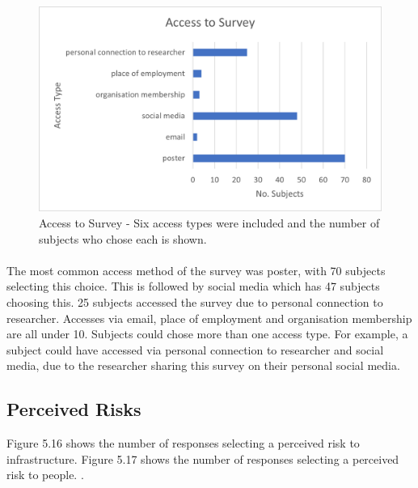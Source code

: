 \begin{figure}[H]
    \centering
    \includegraphics{fig_results/access_survey.png}
    \caption{Access to Survey - Six access types were included and the number of subjects who chose each is shown. }
    \label{fig:my_label}
\end{figure}
\paragraph{}


The most common access method of the survey was poster, with 70 subjects selecting this choice. This is followed by social media which has 47 subjects choosing this. 25 subjects accessed the survey due to personal connection to researcher. Accesses via email, place of employment and organisation membership are all under 10. Subjects could chose more than one access type. For example, a subject could have accessed via personal connection to researcher and social media, due to the researcher sharing this survey on their personal social media.  
\paragraph{}



\subsection{Perceived Risks}
Figure 5.16 shows the  number of responses selecting a perceived risk to infrastructure. Figure 5.17 shows the number of responses selecting a perceived risk to people. .

